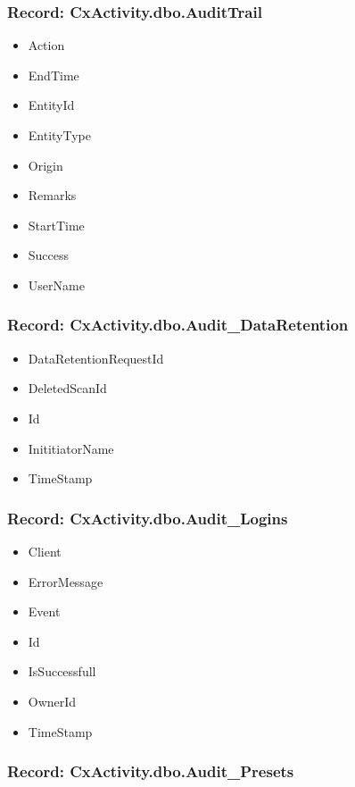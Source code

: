 \subsubsection{Record: CxActivity.dbo.AuditTrail}
\begin{itemize}
    \item Action
    \item EndTime
    \item EntityId
    \item EntityType
    \item Origin
    \item Remarks
    \item StartTime
    \item Success
    \item UserName
\end{itemize}


\subsubsection{Record: CxActivity.dbo.Audit\_DataRetention}
\begin{itemize}
    \item DataRetentionRequestId
    \item DeletedScanId
    \item Id
    \item InititiatorName
    \item TimeStamp
\end{itemize}


\subsubsection{Record: CxActivity.dbo.Audit\_Logins}
\begin{itemize}
    \item Client
    \item ErrorMessage
    \item Event
    \item Id
    \item IsSuccessfull
    \item OwnerId
    \item TimeStamp
\end{itemize}

\subsubsection{Record: CxActivity.dbo.Audit\_Presets}


